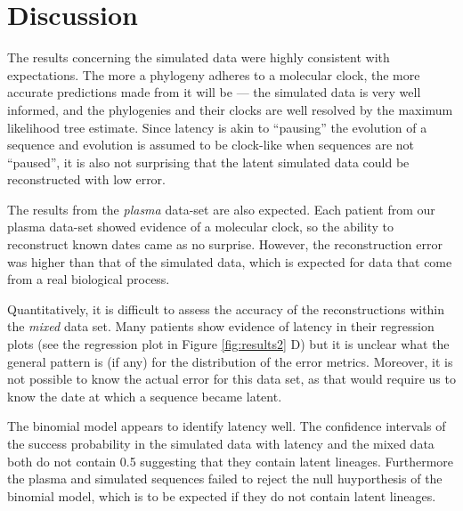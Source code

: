 \documentclass[12pt]{article}
\begin{document}
\section * {Discussion} \label{sec:discuss}

The results concerning the simulated data were highly consistent with expectations. 
The more a phylogeny adheres to a molecular clock, the more accurate predictions made from it will be --- the simulated data is very well informed, and the phylogenies and their clocks are well resolved by the maximum likelihood tree estimate. 
Since latency is akin to ``pausing'' the evolution of a sequence and evolution is assumed to be clock-like when sequences are not ``paused'', it is also not surprising that the latent simulated data could be reconstructed with low error. 

The results from the {\em plasma} data-set are also expected. 
Each patient from our plasma data-set showed evidence of a molecular clock, so the ability to reconstruct known dates came as no surprise. 
However, the reconstruction error was higher than that of the simulated data, which is expected for data that come from a real biological process.

Quantitatively, it is difficult to assess the accuracy of the reconstructions within the {\em mixed} data set. 
Many patients show evidence of latency in their regression plots (see the regression plot in Figure \ref{fig:results2} D) but it is unclear what the general pattern is (if any) for the distribution of the error metrics. 
Moreover, it is not possible to know the actual error for this data set, as that would require us to know the date at which a sequence became latent. 

The {binomial model} appears to identify latency well.
The confidence intervals of the success probability in the simulated data with latency and the mixed data both do not contain 0.5 suggesting that they contain latent lineages.
Furthermore the plasma and simulated sequences failed to reject the null huyporthesis of the {binomial model}, which is to be expected if they do not contain latent lineages.

\end{document}
